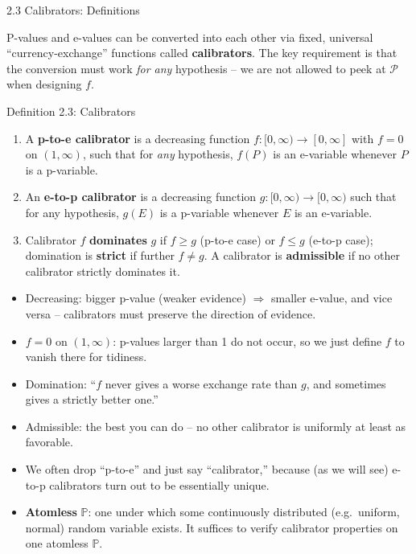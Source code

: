 \documentclass[aspectratio=169,10pt]{beamer}
\newcommand{\PP}{\mathbb{P}}
\newcommand{\calP}{\mathcal{P}}
\begin{document}
\begin{frame}[allowframebreaks]{2.3 Calibrators: Definitions}

P-values and e-values can be converted into each other via fixed,
universal ``currency-exchange'' functions called \textbf{calibrators}.
The key requirement is that the conversion must work \emph{for any}
hypothesis -- we are not allowed to peek at $\calP$ when designing $f$.

  \begin{block}{Definition 2.3: Calibrators}
    \begin{enumerate}
      \item[(i)] A \textbf{p-to-e calibrator} is a decreasing function
        $f:[0,\infty)\to[0,\infty]$ with $f=0$ on $(1,\infty)$, such that
        for \emph{any} hypothesis, $f(P)$ is an e-variable whenever $P$ is
        a p-variable.
      \item[(ii)] An \textbf{e-to-p calibrator} is a decreasing function
        $g:[0,\infty)\to[0,\infty)$ such that for any hypothesis, $g(E)$ is
        a p-variable whenever $E$ is an e-variable.
      \item[(iii)] Calibrator $f$ \textbf{dominates} $g$ if $f\ge g$
        (p-to-e case) or $f\le g$ (e-to-p case); domination is
        \textbf{strict} if further $f\ne g$. A calibrator is
        \textbf{admissible} if no other calibrator strictly dominates it.
      \end{enumerate}
  \end{block}

  \begin{itemize}
    \item Decreasing: bigger p-value (weaker evidence) $\Rightarrow$ smaller
      e-value, and vice versa -- calibrators must preserve the direction
      of evidence.
    \item $f=0$ on $(1,\infty)$: p-values larger than 1 do not occur, so we
      just define $f$ to vanish there for tidiness.
    \item Domination: ``$f$ never gives a worse exchange rate than $g$, and
      sometimes gives a strictly better one.''
    \item Admissible: the best you can do -- no other calibrator is
      uniformly at least as favorable.
    \item We often drop ``p-to-e'' and just say ``calibrator,'' because (as
      we will see) e-to-p calibrators turn out to be essentially unique.
    \item \textbf{Atomless} $\PP$: one under which some continuously
      distributed (e.g.\ uniform, normal) random variable exists. It
      suffices to verify calibrator properties on one atomless $\PP$.
    \end{itemize}


\end{frame}
\end{document}
